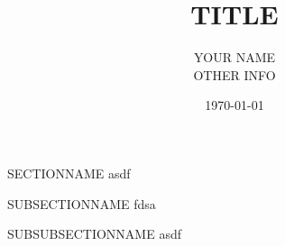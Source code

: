 \documentclass{article}
\title{TITLE}
\author{YOUR NAME \\ OTHER INFO}
\date{\today}
\begin{document}
\maketitle

%
%

\begin{section}{SECTIONNAME}
	asdf
	\begin{subsection}{SUBSECTIONNAME}
		fdsa
		\begin{subsubsection}{SUBSUBSECTIONNAME}
			asdf
		\end{subsubsection}
	\end{subsection}
\end{section}
\end{document}
